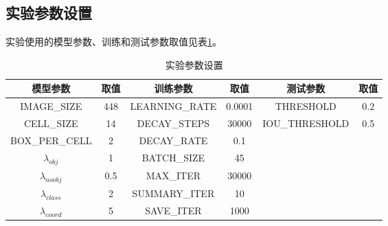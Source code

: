 \subsection{实验参数设置}
实验使用的模型参数、训练和测试参数取值见表\ref{tab:3_3_params}。
\begin{table}[htbp]
	\centering
	\caption{实验参数设置} \label{tab:3_3_params}
	\begin{small} %
		\begin{tabular*}{\textwidth}{@{\extracolsep{\fill}}cccccc} \toprule[2pt]
			模型参数                   & 取值  & 训练参数              & 取值       & 测试参数   & 取值 \\ \midrule[1pt]
			IMAGE\_SIZE            & 448   &  LEARNING\_RATE & 0.0001   & THRESHOLD & 0.2 \\
			CELL\_SIZE               & 14     &  DECAY\_STEPS     & 30000    & IOU\_THRESHOLD & 0.5 \\
			BOX\_PER\_CELL       & 2       &  DECAY\_RATE      & 0.1         & & \\
			$\lambda_{obj}$        & 1       &  BATCH\_SIZE       & 45          & & \\
			$\lambda_{noobj}$    & 0.5    &  MAX\_ITER           & 30000    & & \\
			$\lambda_{class}$     & 2       &  SUMMARY\_ITER  & 10         &  & \\
			$\lambda_{coord}$    & 5       & SAVE\_ITER           & 1000      &  & \\ \bottomrule[2pt]
		\end{tabular*}
	\end{small} %
\end{table}

